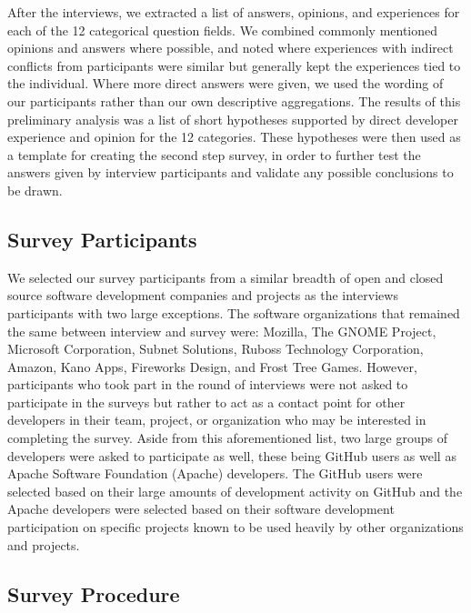 \documentclass[conference]{IEEEtran}
\begin{document}
After the interviews, we extracted a list of answers, opinions, and experiences for each of the 12 categorical
question fields. We combined commonly mentioned opinions and answers where possible, and noted where experiences
with indirect conflicts from participants were similar but generally kept the experiences tied to the individual.
Where more direct answers were given, we used the wording of our participants rather than our own descriptive 
aggregations. The results of this preliminary analysis was a list of short hypotheses supported by direct developer
experience and opinion for the 12 categories. These hypotheses were then used as a template for creating the
second step survey, in order to further test the answers given by interview participants and validate any possible
conclusions to be drawn.

\subsection{Survey Participants}

We selected our survey participants from a similar breadth of open and closed source software development 
companies and projects as the interviews participants with two large exceptions. The software organizations
that remained the same between interview and survey were: Mozilla, The GNOME Project, Microsoft Corporation, 
Subnet Solutions, Ruboss Technology Corporation, Amazon, Kano Apps, Fireworks Design, and Frost Tree Games.
However, participants who took part in the round of interviews were not asked to participate in the surveys but
rather to act as a contact point for other developers in their team, project, or organization who may be interested
in completing the survey. Aside from this aforementioned list, two large groups of developers were asked to
participate as well, these being GitHub users as well as Apache Software Foundation (Apache) developers. The GitHub
users were selected based on their large amounts of development activity on GitHub and the Apache developers
were selected based on their software development participation on specific projects known to be used heavily
by other organizations and projects.

\subsection{Survey Procedure}
\end{document}
